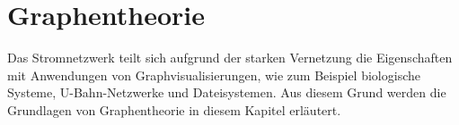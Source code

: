 \chapter{Graphentheorie}
\label{chp:graphtheory}

Das Stromnetzwerk teilt sich aufgrund der starken Vernetzung die Eigenschaften mit Anwendungen von Graphvisualisierungen, wie zum Beispiel biologische Systeme, U-Bahn-Netzwerke und Dateisystemen. Aus diesem Grund werden die Grundlagen von Graphentheorie in diesem Kapitel erläutert.











